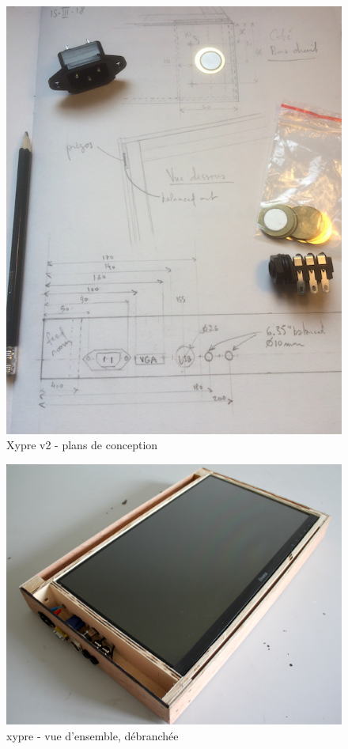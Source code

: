 \begin{figure}[!htbp]
	\includegraphics[width=\textwidth]{gfx/05_interfaces/Xypre_plan01_72dpi.jpg}
	\caption{Xypre v2 - plans de conception}
	\label{fig:interface:xypre_plans}
\end{figure}

\begin{figure}[!htbp]
	\includegraphics[width=\textwidth]{gfx/05_interfaces/xypre_overview_unplugged.jpg}
	\caption{xypre - vue d'ensemble, débranchée}
	\label{fig:interface:xypre}
\end{figure}


